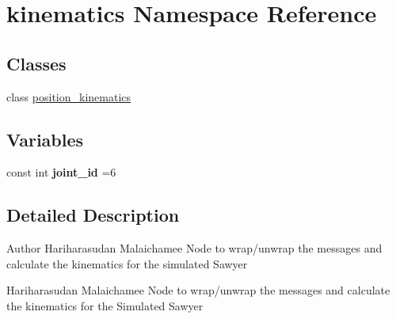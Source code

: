 \hypertarget{namespacekinematics}{\section{kinematics Namespace Reference}
\label{namespacekinematics}
}
\subsection*{Classes}
\begin{DoxyCompactItemize}
\item 
class \hyperlink{classkinematics_1_1position__kinematics}{position\-\_\-kinematics}
\end{DoxyCompactItemize}
\subsection*{Variables}
\begin{DoxyCompactItemize}
\item 
\hypertarget{namespacekinematics_a6209d593221e196aeff3e7bd32565f17}{const int {\bfseries joint\-\_\-id} =6}\label{namespacekinematics_a6209d593221e196aeff3e7bd32565f17}

\end{DoxyCompactItemize}


\subsection{Detailed Description}
\begin{DoxyAuthor}{Author}
Hariharasudan Malaichamee  Node to wrap/unwrap the messages and calculate the kinematics for the simulated Sawyer

Hariharasudan Malaichamee  Node to wrap/unwrap the messages and calculate the kinematics for the Simulated Sawyer 
\end{DoxyAuthor}
